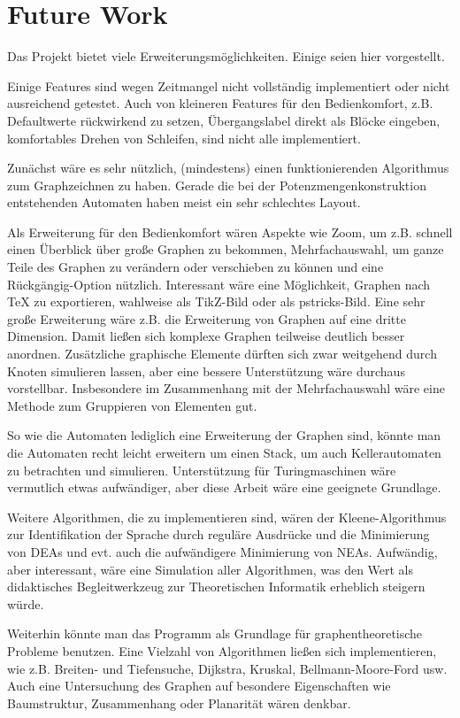 \chapter{Future Work}\label{FutureWork}
Das Projekt bietet viele Erweiterungsmöglichkeiten. Einige seien hier vorgestellt.

Einige Features sind wegen Zeitmangel nicht vollständig implementiert oder nicht ausreichend getestet. Auch von kleineren Features für den Bedienkomfort, z.B. Defaultwerte rückwirkend zu setzen, Übergangslabel direkt als Blöcke eingeben, komfortables Drehen von Schleifen, sind nicht alle implementiert.

Zunächst wäre es sehr nützlich, (mindestens) einen funktionierenden Algorithmus zum Graphzeichnen zu haben. Gerade die bei der Potenzmengenkonstruktion entstehenden Automaten haben meist ein sehr schlechtes Layout.

Als Erweiterung für den Bedienkomfort wären Aspekte wie Zoom, um z.B. schnell einen Überblick über große Graphen zu bekommen, Mehrfachauswahl, um ganze Teile des Graphen zu verändern oder verschieben zu können und eine Rückgängig-Option nützlich. Interessant wäre eine Möglichkeit, Graphen nach TeX zu exportieren, wahlweise als TikZ-Bild oder als pstricks-Bild. Eine sehr große Erweiterung wäre z.B. die Erweiterung von Graphen auf eine dritte Dimension. Damit ließen sich komplexe Graphen teilweise deutlich besser anordnen. Zusätzliche graphische Elemente dürften sich zwar weitgehend durch Knoten simulieren lassen, aber eine bessere Unterstützung wäre durchaus vorstellbar. Insbesondere im Zusammenhang mit der Mehrfachauswahl wäre eine Methode zum Gruppieren von Elementen gut.

So wie die Automaten lediglich eine Erweiterung der Graphen sind, könnte man die Automaten recht leicht erweitern um einen Stack, um auch Kellerautomaten zu betrachten und simulieren. Unterstützung für Turingmaschinen wäre vermutlich etwas aufwändiger, aber diese Arbeit wäre eine geeignete Grundlage.

Weitere Algorithmen, die zu implementieren sind, wären der Kleene-Algorithmus zur Identifikation der Sprache durch reguläre Ausdrücke und die Minimierung von DEAs und evt. auch die aufwändigere Minimierung von NEAs. Aufwändig, aber interessant, wäre eine Simulation aller Algorithmen, was den Wert als didaktisches Begleitwerkzeug zur Theoretischen Informatik erheblich steigern würde.

Weiterhin könnte man das Programm als Grundlage für graphentheoretische Probleme benutzen. Eine Vielzahl von Algorithmen ließen sich implementieren, wie z.B. Breiten- und Tiefensuche, Dijkstra, Kruskal, Bellmann-Moore-Ford usw. Auch eine Untersuchung des Graphen auf besondere Eigenschaften wie Baumstruktur, Zusammenhang oder Planarität wären denkbar.
\endinput
